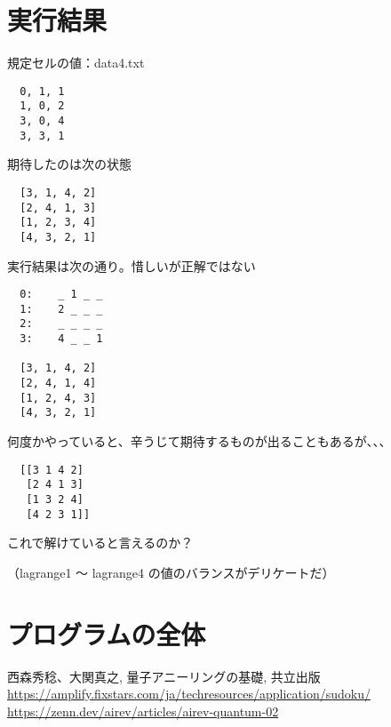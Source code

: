 \documentclass[uplatex,dvipdfmx,a4paper,11pt,oneside,openany]{jsbook}
\begin{document}

\section{実行結果}

規定セルの値：data4.txt
\begin{verbatim}
  0, 1, 1
  1, 0, 2
  3, 0, 4
  3, 3, 1
\end{verbatim}

期待したのは次の状態
\begin{verbatim}
  [3, 1, 4, 2]
  [2, 4, 1, 3]
  [1, 2, 3, 4]
  [4, 3, 2, 1]
\end{verbatim}

実行結果は次の通り。惜しいが正解ではない
\begin{verbatim}
  0:	_ 1 _ _
  1:	2 _ _ _
  2:	_ _ _ _
  3:	4 _ _ 1

  [3, 1, 4, 2]
  [2, 4, 1, 4]
  [1, 2, 4, 3]
  [4, 3, 2, 1]
\end{verbatim}

何度かやっていると、辛うじて期待するものが出ることもあるが、、、
\begin{verbatim}
  [[3 1 4 2]
   [2 4 1 3]
   [1 3 2 4]
   [4 2 3 1]]
\end{verbatim}

これで解けていると言えるのか？

（lagrange1 〜 lagrange4 の値のバランスがデリケートだ）

\section{プログラムの全体}



\begin{thebibliography}{9}
   西森秀稔、大関真之, 量子アニーリングの基礎, 共立出版
   \url{https://amplify.fixstars.com/ja/techresources/application/sudoku/}
   \url{https://zenn.dev/airev/articles/airev-quantum-02}
\end{thebibliography}
\end{document}
